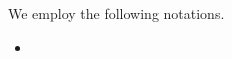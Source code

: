 \documentclass[a4paper,dvipsnames, 11pt]{amsart} %
\begin{document}
\maketitle
\begin{notation}
	We employ the following notations. 
	\begin{itemize}
		\item %
	\end{itemize}
\end{notation}


\end{document}
